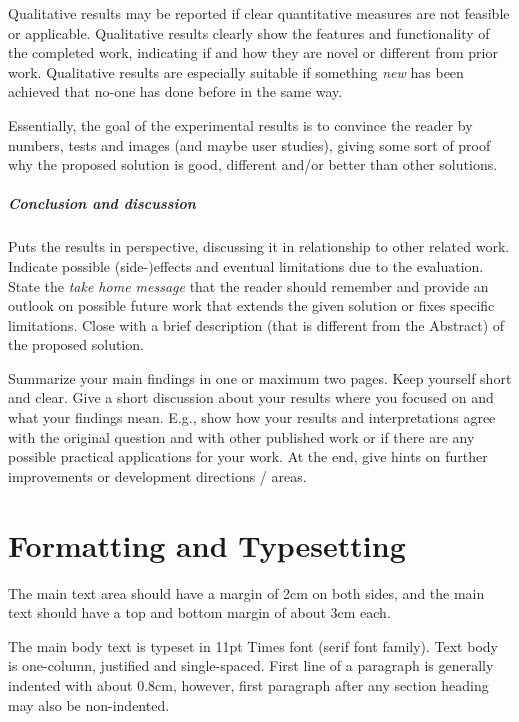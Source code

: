 \documentclass[11pt, a4paper,oneside,chapterprefix=false]{scrbook}
\begin{document}
Qualitative results may be reported if clear quantitative measures are not feasible or applicable. Qualitative results clearly show the features and functionality of the completed work, indicating if and how they are novel or different from prior work. Qualitative results are especially suitable if something {\em new} has been achieved that no-one has done before in the same way.

Essentially, the goal of the experimental results is to convince the reader by numbers, tests and images (and maybe user studies), giving some sort of proof why the proposed solution is good, different and/or better than other solutions.

\paragraph{Conclusion and discussion}

Puts the results in perspective, discussing it in relationship to other related work. Indicate possible (side-)effects and eventual limitations due to the evaluation. State the {\em take home message} that the reader should remember and provide an outlook on possible future work that extends the given solution or fixes specific limitations. Close with a brief description (that is different from the Abstract) of the proposed solution.

Summarize your main findings in one or maximum two pages. Keep yourself short and clear. Give a short discussion about your results where you focused on and what your findings mean. E.g., show how your results and interpretations agree with the original question and with other published work  or if there are any possible practical applications for your work. At the end, give hints on further improvements or development directions / areas. 


\chapter{Formatting and Typesetting} \label{chp:formatting}

The main text area should have a margin of 2cm on both sides, and the main text should have a top and bottom margin of about 3cm each.

The main body text is typeset in 11pt Times font (serif font family). Text body is one-column, justified and single-spaced. First line of a paragraph is generally indented with about 0.8cm, however, first paragraph after any section heading may also be non-indented.
\end{document}
